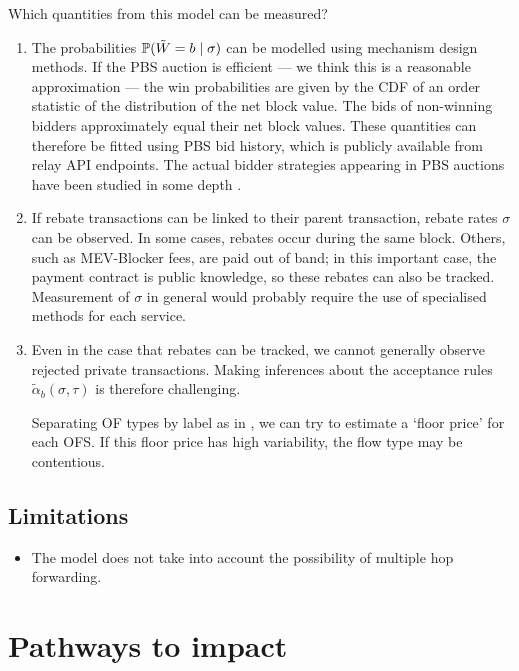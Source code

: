Which quantities from this model can be measured?
%
\begin{enumerate}
  \item
    The probabilities $\mathbb{P}(\tilde{W}=b\mid \sigma)$ can be modelled using mechanism design methods. 
    If the PBS auction is efficient --- we think this is a reasonable approximation --- the win probabilities are given by the CDF of an order statistic of the distribution of the net block value. 
    The bids of non-winning bidders approximately equal their net block values.
    These quantities can therefore be fitted using PBS bid history, which is publicly available from relay API endpoints.
    The actual bidder strategies appearing in PBS auctions have been studied in some depth \cite{thierythomas2023empirical}.

  \item
    If rebate transactions can be linked to their parent transaction, rebate rates $\sigma$ can be observed.
    In some cases, rebates occur during the same block.
    Others, such as MEV-Blocker fees, are paid out of band; in this important case, the payment contract is public knowledge, so these rebates can also be tracked.
    Measurement of $\sigma$ in general would probably require the use of specialised methods for each service.

  \item
    Even in the case that rebates can be tracked, we cannot generally observe rejected private transactions.
    Making inferences about the acceptance rules $\tilde\alpha_b(\sigma,\tau)$ is therefore challenging.
    
    Separating OF types by label as in \cite{oz2024whoa}, we can try to estimate a `floor price' for each OFS.
    If this floor price has high variability, the flow type may be contentious.


\end{enumerate}

\subsection*{Limitations}

\begin{itemize}
  \item The model does not take into account the possibility of multiple hop forwarding.
\end{itemize}


\newpage
\section*{Pathways to impact}

